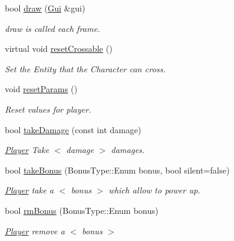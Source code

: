 \begin{DoxyCompactItemize}
bool \hyperlink{class_player_a1194c157df144e864d0328d267dfa75c}{draw} (\hyperlink{class_gui}{Gui} \&gui)
\begin{DoxyCompactList}\small\item\em draw is called each frame. \end{DoxyCompactList}\item 
\mbox{\label{class_player_afc1d1e3a654e241e3ed948aed72ef8a7}} 
virtual void \hyperlink{class_player_afc1d1e3a654e241e3ed948aed72ef8a7}{reset\+Crossable} ()
\begin{DoxyCompactList}\small\item\em Set the Entity that the Character can cross. \end{DoxyCompactList}\item 
\mbox{\label{class_player_afdc99f7dc10aa6c2a7c8bb86c7b8beb5}} 
void \hyperlink{class_player_afdc99f7dc10aa6c2a7c8bb86c7b8beb5}{reset\+Params} ()
\begin{DoxyCompactList}\small\item\em Reset values for player. \end{DoxyCompactList}\item 
bool \hyperlink{class_player_a029b1d511340697d8ccfb7bfa604435b}{take\+Damage} (const int damage)
\begin{DoxyCompactList}\small\item\em \hyperlink{class_player}{Player} Take $<$ damage $>$ damages. \end{DoxyCompactList}\item 
bool \hyperlink{class_player_a7d4df2ce6e2dafb5bfeb179462dc02cb}{take\+Bonus} (Bonus\+Type\+::\+Enum bonus, bool silent=false)
\begin{DoxyCompactList}\small\item\em \hyperlink{class_player}{Player} take a $<$ bonus $>$ which allow to power up. \end{DoxyCompactList}\item 
bool \hyperlink{class_player_abf6efda3ab13411d806493e043c895bf}{rm\+Bonus} (Bonus\+Type\+::\+Enum bonus)
\begin{DoxyCompactList}\small\item\em \hyperlink{class_player}{Player} remove a $<$ bonus $>$ \end{DoxyCompactList}\item 
\mbox{\label{class_player_ab01e550627a1b778e1fa09b29fd89a1a}} 

\end{DoxyCompactItemize}
